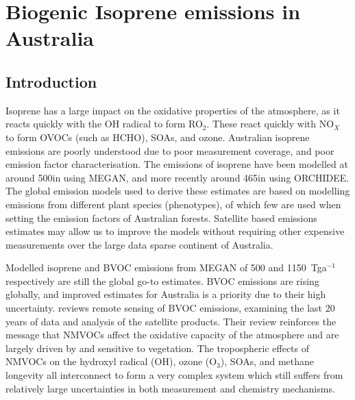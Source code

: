 
%
%



\chapter{Biogenic Isoprene emissions in Australia} %
\label{BioIsop}
  
\section{Introduction}  
\label{BioIsop:intro}  
  
  
  
  Isoprene has a large impact on the oxidative properties of the atmosphere, as it reacts quickly with the OH radical to form RO$_2$.
  These react quickly with NO$_X$ to form OVOCs (such as HCHO), SOAs, and ozone.
  Australian isoprene emissions are poorly understood due to poor measurement coverage, and poor emission factor characterisation.
  The emissions of isoprene have been modelled at around 500\tgcpyr in \textcite{Guenther1995,Guenther2006} using MEGAN, and more recently around 465\tgcpyr in \textcite{Messina2016} using ORCHIDEE.
  The global emission models used to derive these estimates are based on modelling emissions from different plant species (phenotypes), of which few are used when setting the emission factors of Australian forests.
  Satellite based emissions estimates may allow us to improve the models without requiring other expensive measurements over the large data sparse continent of Australia.
  
  Modelled isoprene and BVOC emissions from MEGAN \parencite{Guenther2000} of 500 and 1150~Tga$^{-1}$ respectively are still the global go-to estimates.
  BVOC emissions are rising globally, and improved estimates for Australia is a priority due to their high uncertainty.
  \textcite{Kefauver2014} reviews remote sensing of BVOC emissions, examining the last 20 years of data and analysis of the satellite products.
  Their review reinforces the message that NMVOCs affect the oxidative capacity of the atmosphere and are largely driven by and sensitive to vegetation.
  The tropospheric effects of NMVOCs on the hydroxyl radical (OH), ozone (O$_3$), SOAs, and methane longevity all interconnect to form a very complex system which still suffers from relatively large uncertainties in both measurement and chemistry mechanisms.
  

